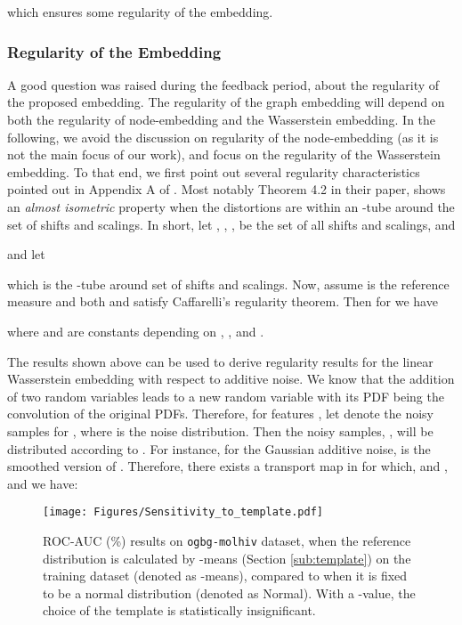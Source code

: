 \documentclass[table]{article} \usepackage{iclr2021_conference,times}
\begin{document}
which ensures some regularity of the embedding.

\subsubsection*{Regularity of the Embedding}
A good question was raised during the feedback period, about the regularity of the proposed embedding. The regularity of the graph embedding will depend on both the regularity of node-embedding and the Wasserstein embedding. In the following, we avoid the discussion on regularity of the node-embedding (as it is not the main focus of our work), and focus on the regularity of the Wasserstein embedding. To that end, we first point out several regularity characteristics pointed out in Appendix A of \cite{moosmuller2020linear}. Most notably Theorem 4.2 in their paper, shows an \emph{almost isometric} property when the distortions are within an -tube around the set of shifts and scalings. In short, let , ,  ,  be the set of all shifts and scalings, and 
        
        and let
        
        which is the -tube around set of shifts and scalings. Now, assume  is the reference measure and both  and  satisfy Caffarelli's regularity theorem. Then for  we have
        
        where  and  are constants depending on , , and . 
        
The results shown above can be used to derive regularity results for the linear Wasserstein embedding with respect to additive noise. We know that the addition of two random variables leads to a new random variable with its PDF being the convolution of the original PDFs. Therefore, for features , let  denote the noisy samples for , where  is the noise distribution. Then the noisy samples, , will be distributed according to . For instance,  for the Gaussian additive noise,  is the smoothed version of . Therefore, there exists a transport map in  for which,  and , and we have:


\begin{figure}[b!]
    \centering
    \texttt{[image: Figures/Sensitivity\_to\_template.pdf]}
    \caption{ROC-AUC (\%) results on \texttt{ogbg-molhiv} dataset, when the reference distribution is calculated by -means (Section \ref{sub:template}) on the training dataset (denoted as -means), compared to when it is fixed to be a normal distribution (denoted as Normal). With a -value, the choice of the template is statistically insignificant.}
    \label{fig:template}
\end{figure}
\end{document}
